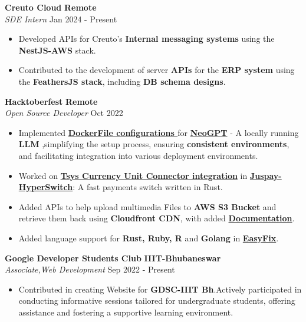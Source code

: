 \vspace{-1pt}

\textbf{Creuto Cloud} \hfill \textbf{Remote}\\
\textit{SDE Intern} \hfill Jan 2024 - Present\\
\vspace{-8pt}
\begin{itemize} 
    \setlength{\itemsep}{-1pt}
	\item Developed APIs for Creuto's \textbf{Internal messaging systems} using the \textbf{NestJS-AWS} stack.
	\item Contributed to the development of server \textbf{APIs} for the \textbf{ERP system} using the \textbf{FeathersJS stack}, including \textbf{DB schema designs}.
\end{itemize}
\vspace{-0.9pt}

\textbf{Hacktoberfest} \hfill \textbf{Remote}\\
\textit{Open Source Developer} \hfill Oct 2022
\vspace{-8pt}
\begin{itemize}
    \setlength{\itemsep}{-1pt}
    \setlength{\parskip}{0pt}
    \item Implemented \href{https://github.com/neokd/NeoGPT/pull/76}{\textbf{\textcolor{linkcolor}{DockerFile configurations }}} for \href{https://neokd.github.io/NeoGPT/}{\textbf{\textcolor{linkcolor}{NeoGPT}}} - A locally running \textbf{LLM} ,simplifying the setup process, ensuring \textbf{consistent environments}, and facilitating integration into various deployment environments.
    \item Worked on \href{https://github.com/juspay/hyperswitch/pull/2749}{\textbf{\textcolor{linkcolor}{Tsys Currency Unit Connector integration}}} in \href{https://github.com/juspay/hyperswitch}{\textbf{\textcolor{linkcolor}{Juspay-HyperSwitch}}}: A fast payments switch written in Rust.
    \item Added APIs to help upload multimedia Files to \textbf{AWS S3 Bucket} and retrieve them back using \textbf{Cloudfront CDN}, with added \href{https://github.com/dishamodi0910/APIVerse}{\textbf{\textcolor{linkcolor}{Documentation}}}.
    \item Added language support for \textbf{Rust, Ruby, R} and \textbf{Golang} in \href{https://github.com/vatsalsinghkv/easy-fix/pull/57}{\textbf{\textcolor{linkcolor}{EasyFix}}}.
\end{itemize} 

\textbf{Google Developer Students Club} \hfill \textbf{IIIT-Bhubaneswar}\\
\textit{Associate,Web Development} \hfill Sep 2022 - Present\\
\vspace{-8pt}
\begin{itemize} 
    \setlength{\itemsep}{-1pt}
    \setlength{\parskip}{0pt}
	\item Contributed in creating Website for \textbf{GDSC-IIIT Bh}.Actively participated in conducting informative sessions tailored for undergraduate students, offering assistance and fostering a supportive learning environment.
\end{itemize}
\vspace{-0.9pt}
